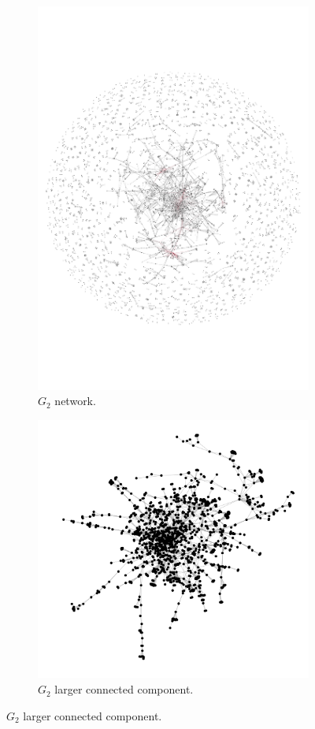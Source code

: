 \documentclass{article}
\theoremstyle{definition}
\begin{document}
\begin{figure}[!hbtp]
     \begin{subfigure}{.45\textwidth}\centering
        \includegraphics[width=.54\textwidth]{./assets/auction.pdf}
        \caption{\(G_2\) network.}\label{fig:g_two}
     \end{subfigure}
    \begin{subfigure}{.45\textwidth}\centering
        \includegraphics[width=.54\textwidth]{./assets/auction_network_cluster.pdf}
        \caption{\(G_2\) larger connected component.}\label{fig:g_two_cluster}
    \end{subfigure}


\end{figure}
\end{document}
